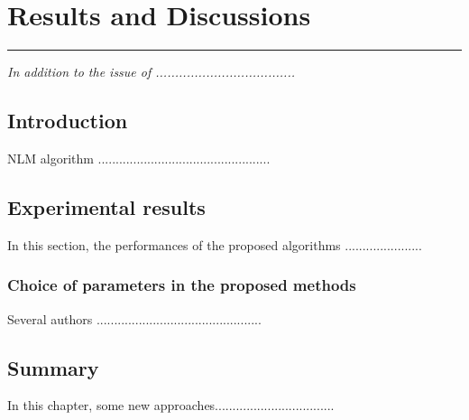 \chapter{Results and Discussions}
\label{C4}
\graphicspath{{Figures/Chapter-4figs/PDF/}{Figures/Chapter-4figs/}}
\noindent\rule{\linewidth}{2pt}
\textit{In addition to the issue of ....................................}
\section{Introduction} \label{S4.1}
NLM algorithm \cite{deadd}.................................................

\section{Experimental results} \label{S4.6}
In this section, the performances of the proposed algorithms ......................
\subsection{Choice of parameters in the proposed methods}
Several authors ...............................................

\section{Summary} 
In this chapter, some new approaches..................................

